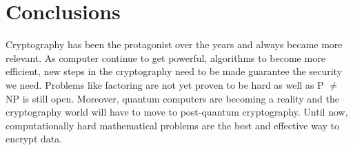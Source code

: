 \chapter{Conclusions}
Cryptography has been the protagonist over the years and always became more relevant. As computer continue to get powerful, algorithms to become more efficient, new steps in the cryptography need to be made guarantee the security we need. Problems like factoring are not yet proven to be hard as well as P $\neq$ NP is still open. Moreover, quantum computers are becoming a reality and the cryptography world will have to move to post-quantum cryptography. Until now, computationally hard mathematical problems are the best and effective way to encrypt data.

